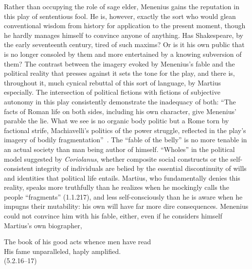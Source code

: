 Rather than occupying the role of sage elder, Menenius gains the reputation in this play of sententious fool.
He is, however, exactly the sort who would glean conventional wisdom from history for application to the present moment, though he hardly manages himself to convince anyone of anything.
Has Shakespeare, by the early seventeenth century, tired of such maxims?
Or is it his own public that is no longer consoled by them and more entertained by a knowing subversion of them?
The contrast between the imagery evoked by Menenius's fable and the political reality that presses against it sets the tone for the play, and there is, throughout it, much cynical rebuttal of this sort of language, by Martius especially.
The intersection of political fictions with fictions of subjective autonomy in this play consistently demonstrate the inadequacy of both: ``The facts of Roman life on both sides, including his own character, give Menenius' parable the lie.
What we see is no organic body politic but a Rome torn by factional strife, Machiavelli's politics of the power struggle, reflected in the play's imagery of bodily fragmentation''~\cite[47]{parker_coriolanus_1994}.
The ``fable of the belly'' is no more tenable in an actual society than man being author of himself.
``Wholes'' in the political model suggested by \emph{Coriolanus}, whether composite social constructs or the self-consistent integrity of individuals are belied by the essential discontinuity of wills and identities that political life entails.
Martius, who fundamentally denies this reality, speaks more truthfully than he realizes when he mockingly calls the people ``fragments'' (1.1.217), and less self-consciously than he is aware when he impugns their mutability: his own will have far more dire consequences.
Menenius could not convince him with his fable, either, even if he considers himself Martius's own biographer,
\begin{vq}
The book of his good acts whence men have read\\
His fame unparalleled, haply amplified.\\
\hfill(5.2.16--17)
\end{vq}

